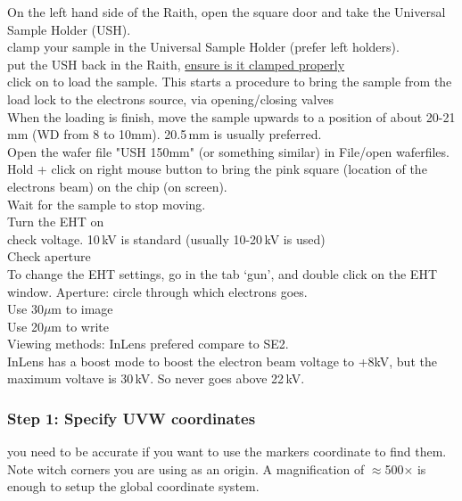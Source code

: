 \documentclass[12pt,a4paper]{report}
\begin{document}
\begin{enumerate}
On the left hand side of the Raith, open the square door and take the Universal Sample Holder (USH).\\

clamp your sample in the Universal Sample Holder (prefer left holders).\\

put the USH back in the Raith, \underline{ensure is it clamped properly}\\

click on  to load the sample. This starts a procedure to bring the sample from the load lock to the electrons source, via opening/closing valves\\

When the loading is finish, move the sample upwards to a position of about 20-21 mm (WD from 8 to 10mm). 20.5\,mm is usually preferred.\\

Open the wafer file "USH 150mm" (or something similar) in File/open waferfiles.\\

Hold  + click on right mouse button to bring the pink square (location of the electrons beam) on the chip (on screen).\\
Wait for the sample to stop moving.\\

Turn the EHT on \\

check voltage. 10\,kV is standard (usually 10-20\,kV is used)\\

Check aperture \\
To change the EHT settings, go in the tab `gun', and double click on the EHT window. Aperture: circle through which electrons goes.\\
Use 30$\mu$m to image\\
Use 20$\mu$m to write\\

Viewing methods: InLens prefered compare to SE2.\\
InLens has a boost mode to boost the electron beam voltage to +8kV, but the maximum voltave is 30\,kV. So never goes above 22\,kV. \\

\subsubsection{Step 1: Specify UVW coordinates}
you need to be accurate if you want to use the markers coordinate to find them. Note witch corners you are using as an origin. A magnification of $\approx$500$\times$  is enough to setup the global coordinate system.\\


\end{enumerate}
\end{document}
